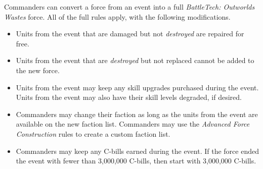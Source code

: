 Commanders can convert a force from an event into a full \emph{BattleTech: Outworlds Wastes} force.
All of the full  rules apply, with the following modifications.

\begin{itemize}

\item Units from the event that are damaged but not \emph{destroyed} are repaired for free.

\item Units from the event that are \emph{destroyed} but not replaced cannot be added to the new force.

\item Units from the event may keep any skill upgrades purchased during the event.
Units from the event may also have their skill levels degraded, if desired.

\item Commanders may change their faction as long as the units from the event are available on the new faction list.
Commanders may use the \emph{Advanced Force Construction} rules to create a custom faction list.

\item Commanders may keep any C-bills earned during the event.
If the force ended the event with fewer than 3,000,000 C-bills, then start with 3,000,000 C-bills.

\end{itemize}
